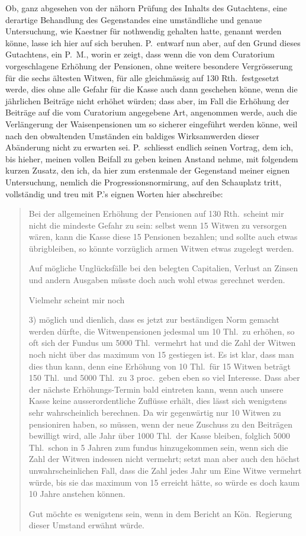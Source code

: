\documentclass[12pt,a4paper]{article}
\begin{document}
Ob, ganz abgesehen von der n\"ahorn Pr\"ufung des Inhalts des Gutachtens, eine derartige Behandlung des Gegenstandes eine umst\"andliche und genaue Untersuchung, wie Kaestner f\"ur nothwendig gehalten hatte, genannt werden k\"onne, lasse ich hier auf sich beruhen. P.\ entwarf nun aber, auf den Grund dieses Gutachtens, ein P.\ M., worin er zeigt, dass wenn die von dem Curatorium vorgeschlagene Erh\"ohung der Pensionen, ohne weitere besondere Vergr\"osserung f\"ur die sechs \"altesten Witwen, f\"ur alle gleichm\"assig auf 130 Rth.\ festgesetzt werde, dies ohne alle Gefahr f\"ur die Kasse auch dann geschehen k\"onne, wenn die j\"ahrlichen Beitr\"age nicht erh\"ohet w\"urden; dass aber, im Fall die Erh\"ohung der Beitr\"age auf die vom Curatorium angegebene Art, angenommen werde, auch die Verl\"angerung der Waisenpensionen um so sicherer eingef\"uhrt werden k\"onne, weil nach den obwaltenden Umst\"anden ein baldiges Wirksamwerden dieser Ab\"anderung nicht zu erwarten sei. P.\ schliesst endlich seinen Vortrag, dem ich, bis hieher, meinen vollen Beifall zu geben keinen Anstand nehme, mit folgendem kurzen Zusatz, den ich, da hier zum erstenmale der Gegenstand meiner eignen Untersuchung, nemlich die Progressionsnormirung, auf den Schauplatz tritt, vollst\"andig und treu mit P.'s eignen Worten hier abschreibe:

\begin{quote}
Bei der allgemeinen Erh\"ohung der Pensionen auf 130 Rth.\ scheint mir nicht die mindeste Gefahr zu sein: selbst wenn 15 Witwen zu versorgen w\"aren, kann die Kasse diese 15 Pensionen bezahlen; und sollte auch etwas \"ubrigbleiben, so k\"onnte vorz\"uglich armen Witwen etwas zugelegt werden.

Auf m\"ogliche Ungl\"ucksf\"alle bei den belegten Capitalien, Verlust an Zinsen und andern Ausgaben m\"usste doch auch wohl etwas gerechnet werden.

Vielmehr scheint mir noch

3) m\"oglich und dienlich, dass es jetzt zur best\"andigen Norm gemacht werden d\"urfte, die Witwenpensionen jedesmal um 10 Thl.\ zu erh\"ohen, so oft sich der Fundus um 5000 Thl.\ vermehrt hat und die Zahl der Witwen noch nicht \"uber das maximum von 15 gestiegen ist. Es ist klar, dass man dies thun kann, denn eine Erh\"ohung von 10 Thl.\ f\"ur 15 Witwen betr\"agt 150 Thl.\ und 5000 Thl.\ zu 3 proc.\ geben eben so viel Interesse. Dass aber der n\"achste Erh\"ohungs-Termin bald eintreten kann, wenn auch unsere Kasse keine ausserordentliche Zufl\"usse erh\"alt, dies l\"asst sich wenigstens sehr wahrscheinlich berechnen. Da wir gegenw\"artig nur 10 Witwen zu pensioniren haben, so m\"ussen, wenn der neue Zuschuss zu den Beitr\"agen bewilligt wird, alle Jahr \"uber 1000 Thl.\ der Kasse bleiben, folglich 5000 Thl.\ schon in 5 Jahren zum fundus hinzugekommen sein, wenn sich die Zahl der Witwen indessen nicht vermehrt; setzt man aber auch den h\"ochst unwahrscheinlichen Fall, dass die Zahl jedes Jahr um Eine Witwe vermehrt w\"urde, bis sie das maximum von 15 erreicht h\"atte, so w\"urde es doch kaum 10 Jahre anstehen k\"onnen.

Gut m\"ochte es wenigstens sein, wenn in dem Bericht an K\"on.\ Regierung dieser Umstand erw\"ahnt w\"urde.
\end{quote}
\end{document}
